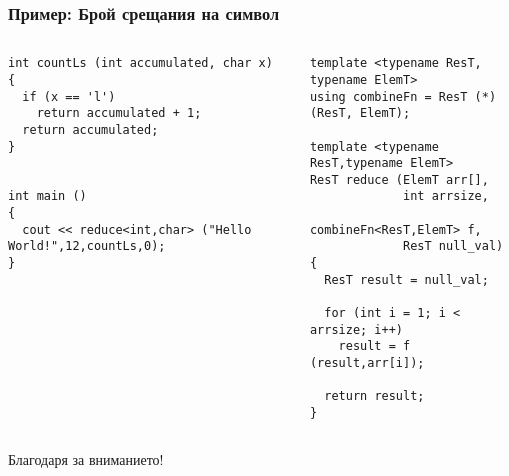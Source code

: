 \documentclass{beamer}
\begin{document}
\begin{frame}[fragile]
\frametitle{Пример: Брой срещания на символ}


\begin{columns}[t]
  \begin{column}{0.55\textwidth}

\begin{flushleft}
\begin{lstlisting}
int countLs (int accumulated, char x)
{
  if (x == 'l')
    return accumulated + 1;
  return accumulated;
}


int main ()
{
  cout << reduce<int,char> ("Hello World!",12,countLs,0);
}

\end{lstlisting}  
\end{flushleft}
  \end{column}
  \begin{column}{0.45\textwidth}
\begin{flushleft}
\vspace{-30px}
\begin{lstlisting}
template <typename ResT, typename ElemT>
using combineFn = ResT (*) (ResT, ElemT);

template <typename ResT,typename ElemT>
ResT reduce (ElemT arr[], 
             int arrsize, 
             combineFn<ResT,ElemT> f, 
             ResT null_val)
{
  ResT result = null_val;

  for (int i = 1; i < arrsize; i++)
    result = f (result,arr[i]);

  return result;
}
\end{lstlisting}  
\end{flushleft}

  \end{column}
\end{columns}


\end{frame}

\begin{frame}
\centerline{Благодаря за вниманието!}
\end{frame}
\end{document}
